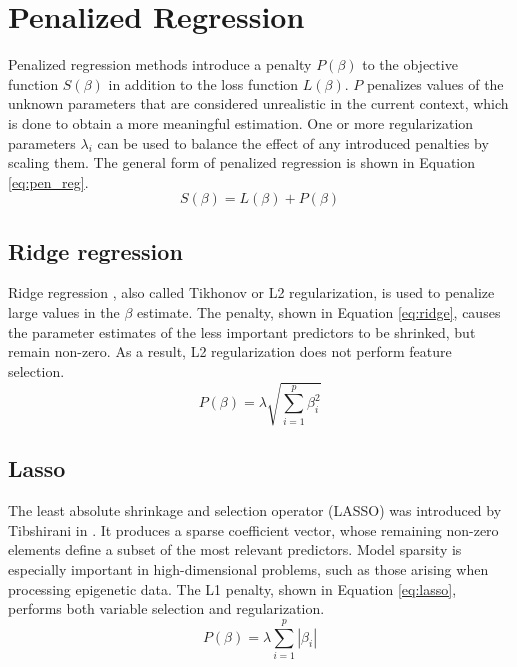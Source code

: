 \section{Penalized Regression}
Penalized regression methods introduce a penalty $P(\beta)$ to the objective function $S(\beta)$ in addition to the loss function $L(\beta)$. $P$ penalizes values of the unknown parameters that are considered unrealistic in the current context, which is done to obtain a more meaningful estimation. One or more regularization parameters $\lambda_i$ can be used to balance the effect of any introduced penalties by scaling them. The general form of penalized regression is shown in Equation \ref{eq:pen_reg}. 
\begin{equation} \label{eq:pen_reg}
S(\beta) = L(\beta) + P(\beta)
\end{equation}


\subsection{Ridge regression}
Ridge regression \cite{hoerl1970ridge}, also called Tikhonov or L2 regularization, is used to penalize large values in the $\beta$ estimate. The penalty, shown in Equation \ref{eq:ridge}, causes the parameter estimates of the less important predictors to be shrinked, but remain non-zero. As a result, L2 regularization does not perform feature selection.
\begin{equation} \label{eq:ridge}
P(\beta) = \lambda\sqrt{\sum_{i=1}^{p}\beta_i^2}
\end{equation}


\subsection{Lasso} \label{sec:lasso}
The least absolute shrinkage and selection operator (LASSO) was introduced by Tibshirani in \cite{tibshirani1996regression}. It produces a sparse coefficient vector, whose remaining non-zero elements define a subset of the most relevant predictors. Model sparsity is especially important in high-dimensional problems, such as those arising when processing epigenetic data. The L1 penalty, shown in Equation \ref{eq:lasso}, performs both variable selection and regularization.
\begin{equation} \label{eq:lasso}
P(\beta) = \lambda\sum_{i=1}^{p}\left|\beta_i\right|
\end{equation}


